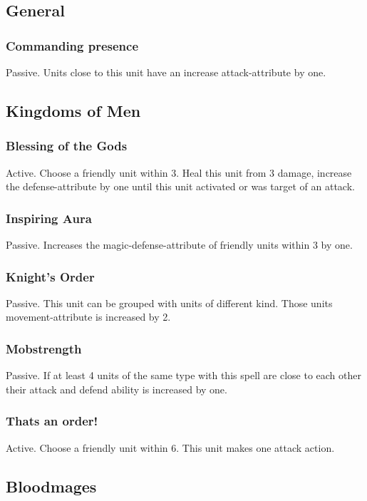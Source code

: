 \documentclass[a5paper,pagesize,10pt,bibtotoc,pointlessnumbers,
normalheadings,DIV=9,twoside=false]{scrbook}
\begin{document}
\subsection{General}

\subsubsection{Commanding presence}
Passive. Units close to this unit have an increase attack-attribute by one.


\newpage
\subsection{Kingdoms of Men}

\subsubsection{Blessing of the Gods}
Active. Choose a friendly unit within 3. Heal this unit from 3 damage, increase the defense-attribute by one until this unit activated or was target of an attack.

\subsubsection{Inspiring Aura}
Passive. Increases the magic-defense-attribute of friendly units within 3 by one.

\subsubsection{Knight's Order}
Passive. This unit can be grouped with units of different kind. Those units movement-attribute is increased by 2.

\subsubsection{Mobstrength}
Passive. If at least 4 units of the same type with this spell are close to each other their attack and defend ability is increased by one.

\subsubsection{Thats an order!}
Active. Choose a friendly unit within 6. This unit makes one attack action.

\newpage
\subsection{Bloodmages}
\end{document}
